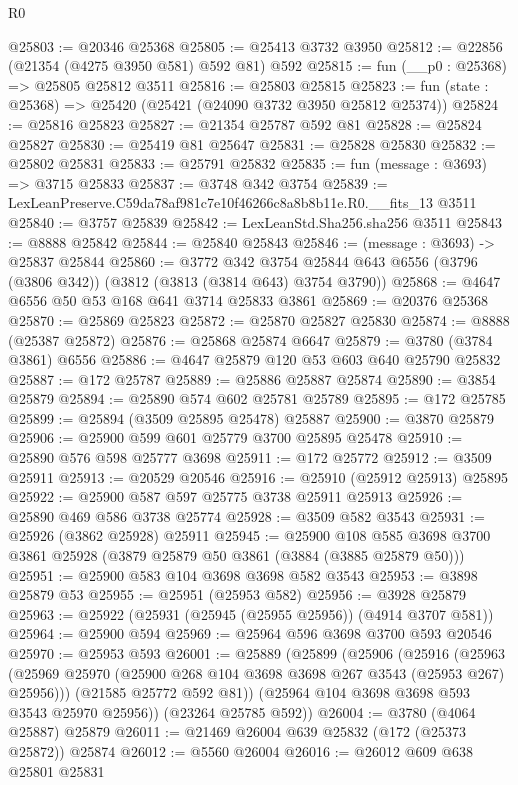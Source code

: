 \begin{lexlean}{R0}
\begin{coremodule}
@25803 := @20346 @25368
@25805 := @25413 @3732 @3950
@25812 := @22856 (@21354 (@4275 @3950 @581) @592 @81) @592
@25815 := fun (__p0 : @25368) => @25805 @25812 @3511
@25816 := @25803 @25815
@25823 := fun (state : @25368) => @25420 (@25421 (@24090 @3732 @3950 @25812 @25374))
@25824 := @25816 @25823
@25827 := @21354 @25787 @592 @81
@25828 := @25824 @25827
@25830 := @25419 @81 @25647
@25831 := @25828 @25830
@25832 := @25802 @25831
@25833 := @25791 @25832
@25835 := fun (message : @3693) => @3715 @25833
@25837 := @3748 @342 @3754
@25839 := LexLeanPreserve.C59da78af981c7e10f46266c8a8b8b11e.R0.__fits_13 @3511
@25840 := @3757 @25839
@25842 := LexLeanStd.Sha256.sha256 @3511
@25843 := @8888 @25842
@25844 := @25840 @25843
@25846 := (message : @3693) -> @25837 @25844
@25860 := @3772
    @342
    @3754
    @25844
    @643
    @6556
    (@3796 (@3806 @342))
    (@3812 (@3813 (@3814 @643) @3754 @3790))
@25868 := @4647 @6556 @50 @53 @168 @641 @3714 @25833 @3861
@25869 := @20376 @25368
@25870 := @25869 @25823
@25872 := @25870 @25827 @25830
@25874 := @8888 (@25387 @25872)
@25876 := @25868 @25874 @6647
@25879 := @3780 (@3784 @3861) @6556
@25886 := @4647 @25879 @120 @53 @603 @640 @25790 @25832
@25887 := @172 @25787
@25889 := @25886 @25887 @25874
@25890 := @3854 @25879
@25894 := @25890 @574 @602 @25781 @25789
@25895 := @172 @25785
@25899 := @25894 (@3509 @25895 @25478) @25887
@25900 := @3870 @25879
@25906 := @25900 @599 @601 @25779 @3700 @25895 @25478
@25910 := @25890 @576 @598 @25777 @3698
@25911 := @172 @25772
@25912 := @3509 @25911
@25913 := @20529 @20546
@25916 := @25910 (@25912 @25913) @25895
@25922 := @25900 @587 @597 @25775 @3738 @25911 @25913
@25926 := @25890 @469 @586 @3738 @25774
@25928 := @3509 @582 @3543
@25931 := @25926 (@3862 @25928) @25911
@25945 := @25900
    @108
    @585
    @3698
    @3700
    @3861
    @25928
    (@3879 @25879 @50 @3861 (@3884 (@3885 @25879 @50)))
@25951 := @25900 @583 @104 @3698 @3698 @582 @3543
@25953 := @3898 @25879 @53
@25955 := @25951 (@25953 @582)
@25956 := @3928 @25879
@25963 := @25922 (@25931 (@25945 (@25955 @25956)) (@4914 @3707 @581))
@25964 := @25900 @594
@25969 := @25964 @596 @3698 @3700 @593 @20546
@25970 := @25953 @593
@26001 := @25889
    (@25899
      (@25906
        (@25916
          (@25963 (@25969 @25970 (@25900 @268 @104 @3698 @3698 @267 @3543 (@25953 @267) @25956)))
          (@21585 @25772 @592 @81))
        (@25964 @104 @3698 @3698 @593 @3543 @25970 @25956))
      (@23264 @25785 @592))
@26004 := @3780 (@4064 @25887) @25879
@26011 := @21469 @26004 @639 @25832 (@172 (@25373 @25872)) @25874
@26012 := @5560 @26004
@26016 := @26012 @609 @638 @25801 @25831

\end{coremodule}
\end{lexlean}
